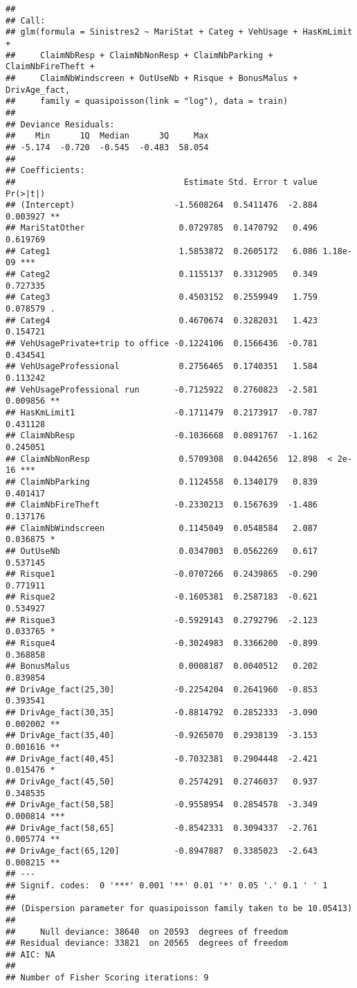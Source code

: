 \documentclass[
]{article}
\begin{document}
\begin{verbatim}
## 
## Call:
## glm(formula = Sinistres2 ~ MariStat + Categ + VehUsage + HasKmLimit + 
##     ClaimNbResp + ClaimNbNonResp + ClaimNbParking + ClaimNbFireTheft + 
##     ClaimNbWindscreen + OutUseNb + Risque + BonusMalus + DrivAge_fact, 
##     family = quasipoisson(link = "log"), data = train)
## 
## Deviance Residuals: 
##    Min      1Q  Median      3Q     Max  
## -5.174  -0.720  -0.545  -0.483  58.054  
## 
## Coefficients:
##                                  Estimate Std. Error t value Pr(>|t|)    
## (Intercept)                    -1.5608264  0.5411476  -2.884 0.003927 ** 
## MariStatOther                   0.0729785  0.1470792   0.496 0.619769    
## Categ1                          1.5853872  0.2605172   6.086 1.18e-09 ***
## Categ2                          0.1155137  0.3312905   0.349 0.727335    
## Categ3                          0.4503152  0.2559949   1.759 0.078579 .  
## Categ4                          0.4670674  0.3282031   1.423 0.154721    
## VehUsagePrivate+trip to office -0.1224106  0.1566436  -0.781 0.434541    
## VehUsageProfessional            0.2756465  0.1740351   1.584 0.113242    
## VehUsageProfessional run       -0.7125922  0.2760823  -2.581 0.009856 ** 
## HasKmLimit1                    -0.1711479  0.2173917  -0.787 0.431128    
## ClaimNbResp                    -0.1036668  0.0891767  -1.162 0.245051    
## ClaimNbNonResp                  0.5709308  0.0442656  12.898  < 2e-16 ***
## ClaimNbParking                  0.1124558  0.1340179   0.839 0.401417    
## ClaimNbFireTheft               -0.2330213  0.1567639  -1.486 0.137176    
## ClaimNbWindscreen               0.1145049  0.0548584   2.087 0.036875 *  
## OutUseNb                        0.0347003  0.0562269   0.617 0.537145    
## Risque1                        -0.0707266  0.2439865  -0.290 0.771911    
## Risque2                        -0.1605381  0.2587183  -0.621 0.534927    
## Risque3                        -0.5929143  0.2792796  -2.123 0.033765 *  
## Risque4                        -0.3024983  0.3366200  -0.899 0.368858    
## BonusMalus                      0.0008187  0.0040512   0.202 0.839854    
## DrivAge_fact(25,30]            -0.2254204  0.2641960  -0.853 0.393541    
## DrivAge_fact(30,35]            -0.8814792  0.2852333  -3.090 0.002002 ** 
## DrivAge_fact(35,40]            -0.9265070  0.2938139  -3.153 0.001616 ** 
## DrivAge_fact(40,45]            -0.7032381  0.2904448  -2.421 0.015476 *  
## DrivAge_fact(45,50]             0.2574291  0.2746037   0.937 0.348535    
## DrivAge_fact(50,58]            -0.9558954  0.2854578  -3.349 0.000814 ***
## DrivAge_fact(58,65]            -0.8542331  0.3094337  -2.761 0.005774 ** 
## DrivAge_fact(65,120]           -0.8947887  0.3385023  -2.643 0.008215 ** 
## ---
## Signif. codes:  0 '***' 0.001 '**' 0.01 '*' 0.05 '.' 0.1 ' ' 1
## 
## (Dispersion parameter for quasipoisson family taken to be 10.05413)
## 
##     Null deviance: 38640  on 20593  degrees of freedom
## Residual deviance: 33821  on 20565  degrees of freedom
## AIC: NA
## 
## Number of Fisher Scoring iterations: 9
\end{verbatim}
\end{document}
